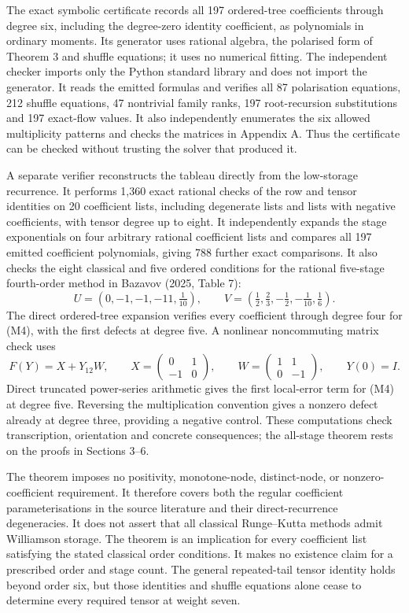 \documentclass[
  11pt,
  a4paper,
]{scrartcl}
\begin{document}
The exact symbolic certificate records all 197 ordered-tree coefficients
through degree six, including the degree-zero identity coefficient, as
polynomials in ordinary moments. Its generator uses rational algebra,
the polarised form of Theorem 3 and shuffle equations; it uses no
numerical fitting. The independent checker imports only the Python
standard library and does not import the generator. It reads the emitted
formulas and verifies all 87 polarisation equations, 212 shuffle
equations, 47 nontrivial family ranks, 197 root-recursion substitutions
and 197 exact-flow values. It also independently enumerates the six
allowed multiplicity patterns and checks the matrices in Appendix A.
Thus the certificate can be checked without trusting the solver that
produced it.

A separate verifier reconstructs the tableau directly from the
low-storage recurrence. It performs 1,360 exact rational checks of the
row and tensor identities on 20 coefficient lists, including degenerate
lists and lists with negative coefficients, with tensor degree up to
eight. It independently expands the stage exponentials on four arbitrary
rational coefficient lists and compares all 197 emitted coefficient
polynomials, giving 788 further exact comparisons. It also checks the
eight classical and five ordered conditions for the rational five-stage
fourth-order method in Bazavov (2025, Table 7): \[
U=(0,-1,-1,-11,\tfrac1{10}),\qquad
V=(\tfrac12,\tfrac23,-\tfrac12,-\tfrac1{10},\tfrac16).
\tag{M4}
\] The direct ordered-tree expansion verifies every coefficient through
degree four for (M4), with the first defects at degree five. A nonlinear
noncommuting matrix check uses \[
F(Y)=X+Y_{12}W,\qquad
X=\begin{pmatrix}0&1\\-1&0\end{pmatrix},\qquad
W=\begin{pmatrix}1&1\\0&-1\end{pmatrix},\qquad Y(0)=I.
\] Direct truncated power-series arithmetic gives the first local-error
term for (M4) at degree five. Reversing the multiplication convention
gives a nonzero defect already at degree three, providing a negative
control. These computations check transcription, orientation and
concrete consequences; the all-stage theorem rests on the proofs in
Sections 3--6.

The theorem imposes no positivity, monotone-node, distinct-node, or
nonzero-coefficient requirement. It therefore covers both the regular
coefficient parameterisations in the source literature and their
direct-recurrence degeneracies. It does not assert that all classical
Runge--Kutta methods admit Williamson storage. The theorem is an
implication for every coefficient list satisfying the stated classical
order conditions. It makes no existence claim for a prescribed order and
stage count. The general repeated-tail tensor identity holds beyond
order six, but those identities and shuffle equations alone cease to
determine every required tensor at weight seven.
\end{document}
